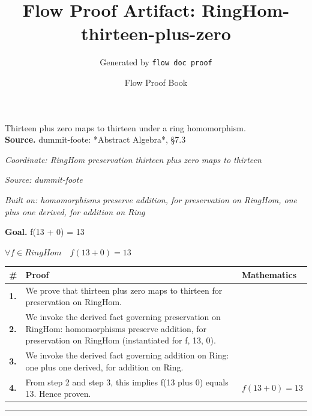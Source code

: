 \documentclass[11pt]{article}
\title{Flow Proof Artifact: RingHom-thirteen-plus-zero}
\author{Generated by \texttt{flow doc proof}}
\date{Flow Proof Book}
\theoremstyle{definition}
\begin{document}
\maketitle
Thirteen plus zero maps to thirteen under a ring homomorphism.\\[0.5em]
\textbf{Source.} dummit-foote: *Abstract Algebra*, §7.3\\[0.5em]
\bigskip
{}\par
\smallskip\noindent\textit{Coordinate: RingHom \cdot preservation \cdot thirteen plus zero maps to thirteen}\par
\smallskip\noindent\textit{Source: dummit-foote}\par
\smallskip\noindent\textit{Built on: homomorphisms preserve addition, for preservation on RingHom, one plus one derived, for addition on Ring}\par
\medskip
\noindent\textbf{Goal.} f(13 + 0) = 13\par
\noindent$\displaystyle \forall f \in RingHom\quad f(13 + 0) = 13$\par
\medskip
\noindent
\begin{tabular}{@{} >{\raggedright\arraybackslash}p{} >{\raggedright\arraybackslash}p{} >{\raggedleft\arraybackslash}p{} @{}}
\textbf{\#} & \textbf{Proof} & \textbf{Mathematics} \\
\midrule
\textbf{1.} & We prove that thirteen plus zero maps to thirteen for preservation on RingHom. & \\[0.45em]
\textbf{2.} & We invoke the derived fact governing preservation on RingHom: homomorphisms preserve addition, for preservation on RingHom (instantiated for f, 13, 0). & \\[0.45em]
\textbf{3.} & We invoke the derived fact governing addition on Ring: one plus one derived, for addition on Ring. & \\[0.45em]
\textbf{4.} & From step 2 and step 3, this implies f(13 plus 0) equals 13. Hence proven. & $\displaystyle f(13 + 0) = 13$ \\[0.45em]
\bottomrule
\end{tabular}
\label{thm:RingHom-preservation-thirteen_plus_zero_maps_to_thirteen}
\par\medskip\hrule
\end{document}
